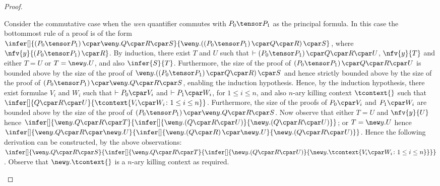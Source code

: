 \begin{proof}
\begin{enumerate}[label=\textbf{\Alph*},ref=\Alph*,leftmargin=*]
{Consider the commutative case when the \textit{wen} quantifier commutes with $P_0 \tensor P_1$ as the principal formula.
In this case the bottommost rule of a proof is of the form $
\infer[]{
\left( P_0 \tensor P_1 \right) \cpar \wen y. Q \cpar R \cpar S
}{
 \mathopen{\wen y.} \left( \left( P_0 \tensor P_1 \right) \cpar Q \cpar R\right) \cpar S
}$, where $\nfv{y}{\left( P_0 \tensor P_1 \right) \cpar R}$.
By induction, there exist $T$ and $U$ such that $\vdash \left( P_0 \tensor P_1 \right) \cpar Q \cpar R \cpar U$, $\nfv{y}{T}$ and either $T = U$ or $T = \new y. U$, and also
$\infer{S}{T}$.
Furthermore, the size of the proof of $\left( P_0 \tensor P_1 \right) \cpar Q \cpar R \cpar U$ is bounded above by the size of the proof of $\mathopen{\wen y.} \left( \left( P_0 \tensor P_1 \right) \cpar Q \cpar R\right) \cpar S$ and hence strictly bounded above by the size of the proof of $\left( P_0 \tensor P_1 \right) \cpar \wen y. Q \cpar R \cpar S$, enabling the induction hypothesis.
Hence, by the induction hypothesis, there exist formulae $V_i$ and $W_i$ such that $\vdash P_0 \cpar V_i$ and $\vdash P_1 \cpar W_i$, for $1 \leq i \leq n$, and also $n$-ary killing context $\tcontext{}$ such that
$\infer[]{
Q \cpar R \cpar U
}{
\tcontext{ V_i \cpar W_i \colon 1 \leq i \leq n }
}$.
Furthermore, the size of the proofs of $P_0 \cpar V_i$ and $P_1 \cpar W_i$ are bounded above by the size of the proof of $\left( P_0 \tensor P_1 \right) \cpar \wen y. Q \cpar R \cpar S$.
Now observe that either $T = U$ and $\nfv{y}{U}$ hence
$\infer[]{
\wen y. Q \cpar R \cpar T
}{
\infer[]{
\mathopen{\wen y.} \left(Q \cpar R \cpar U\right)
}{
 \mathopen{\new y.} \left(Q \cpar R \cpar U\right)
}}$;
or $T = \new y. U$ hence $
\infer[]{
\wen y. Q \cpar R \cpar \new y. U
}{
\infer[]{
\mathopen{\wen y.} \left(Q \cpar R\right) \cpar \new y. U
}{
 \mathopen{\new y.} \left(Q \cpar R \cpar U\right)
}}$.
Hence the following derivation can be constructed, by the above observations:
$
\infer[]{
\wen y. Q \cpar R \cpar S
}{
\infer[]{
\wen y. Q \cpar R \cpar T
}{
\infer[]{
\mathopen{\new y.} \left( Q \cpar R \cpar U \right)
}{
\mathopen{\new y.} \tcontext{ V_i \cpar W_i \colon 1 \leq i \leq n }
}}}
$.
Observe that $\new y. \tcontext{ }$ is a $n$-ary killing context as required.
\smallskip



}
\end{enumerate}
\end{proof}
